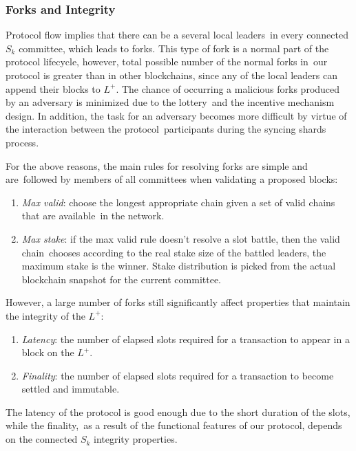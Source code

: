 \subsubsection{Forks and Integrity}\label{subsubsec:resolving-forks}

Protocol flow implies that there can be a several local leaders\
in every connected $S_k$ committee, which leads to forks.
This type of fork is a normal part of the protocol lifecycle, however, total possible number of the normal forks in\
our protocol is greater than in other blockchains, since any of the local leaders can append their blocks to $L^+$.
The chance of occurring a malicious forks produced by an adversary is minimized due to the lottery\
and the incentive mechanism design.
In addition, the task for an adversary becomes more difficult by virtue of the interaction between the protocol\
participants during the syncing shards process.

For the above reasons, the main rules for resolving forks are simple and are\
followed by members of all committees when validating a proposed blocks:
\begin{enumerate}
    \item \textit{Max valid}: choose the longest appropriate chain given a set of valid chains that are available\
    in the network.
    \item \textit{Max stake}: if the max valid rule doesn't resolve a slot battle, then the valid chain\
    chooses according to the real stake size of the battled leaders, the maximum stake is the winner.
    Stake distribution is picked from the actual blockchain snapshot for the current committee.
\end{enumerate}

However, a large number of forks still significantly affect properties that maintain the integrity of the $L^+$:
\begin{enumerate}
    \item \textit{Latency}: the number of elapsed slots required for a transaction to appear in a block on the $L^+$.
    \item \textit{Finality}: the number of elapsed slots required for a transaction to become settled and immutable.
\end{enumerate}
The latency of the protocol is good enough due to the short duration of the slots, while the finality,\
as a result of the functional features of our protocol, depends on the connected $S_k$ integrity properties.

